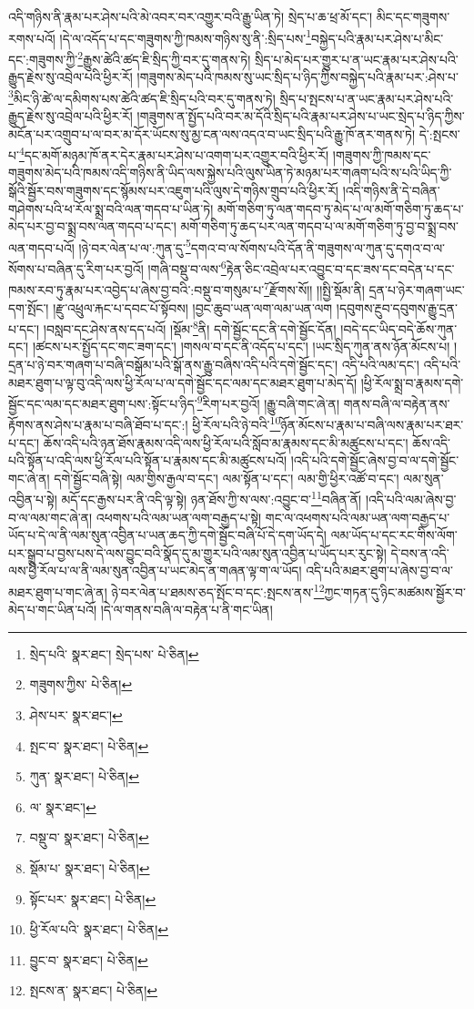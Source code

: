 འདི་གཉིས་ནི་རྣམ་པར་ཤེས་པའི་མེ་འབར་བར་འགྱུར་བའི་རྒྱུ་ཡིན་ཏེ། སྲེད་པ་ཆ་ཕྲ་མོ་དང་། མིང་དང་གཟུགས་རགས་པའོ། །དེ་ལ་འདོད་པ་དང་གཟུགས་ཀྱི་ཁམས་གཉིས་སུ་ནི་:སྲིད་པས་\footnote{སྲེད་པའི་  སྣར་ཐང་། སྲེད་པས་  པེ་ཅིན། }བསྐྱེད་པའི་རྣམ་པར་ཤེས་པ་མིང་དང་:གཟུགས་ཀྱི་\footnote{གཟུགས་ཀྱིས་  པེ་ཅིན། }རྒྱུས་ཚེའི་ཚད་ཇི་སྲིད་ཀྱི་བར་དུ་གནས་ཏེ། སྲིད་པ་མེད་པར་གྱུར་པ་ན་ཡང་རྣམ་པར་ཤེས་པའི་རྒྱུད་རྗེས་སུ་འབྲེལ་པའི་ཕྱིར་རོ། །གཟུགས་མེད་པའི་ཁམས་སུ་ཡང་སྲིད་པ་ཉིད་ཀྱིས་བསྐྱེད་པའི་རྣམ་པར་:ཤེས་པ་\footnote{ཤེས་པར་  སྣར་ཐང་། }མིང་ཉི་ཚེ་ལ་དམིགས་པས་ཚེའི་ཚད་ཇི་སྲིད་པའི་བར་དུ་གནས་ཏེ། སྲིད་པ་སྤངས་པ་ན་ཡང་རྣམ་པར་ཤེས་པའི་རྒྱུད་རྗེས་སུ་འབྲེལ་པའི་ཕྱིར་རོ། །གཟུགས་ན་སྤྱོད་པའི་བར་མ་དོའི་སྲིད་པའི་རྣམ་པར་ཤེས་པ་ཡང་སྲེད་པ་ཉིད་ཀྱིས་མངོན་པར་འགྲུབ་པ་ལ་བར་མ་དོར་ཡོངས་སུ་མྱ་ངན་ལས་འདའ་བ་ཡང་སྲིད་པའི་རྒྱུ་ཁོ་ནར་གནས་ཏེ། དེ་:སྤངས་པ་\footnote{སྤང་བ་  སྣར་ཐང་།  པེ་ཅིན། }དང་མགོ་མཉམ་ཁོ་ནར་དེར་རྣམ་པར་ཤེས་པ་འགག་པར་འགྱུར་བའི་ཕྱིར་རོ། །གཟུགས་ཀྱི་ཁམས་དང་གཟུགས་མེད་པའི་ཁམས་འདི་གཉིས་ནི་ཡིད་ལས་སྐྱེས་པའི་ལུས་ཡིན་ཏེ་མཉམ་པར་གཞག་པའི་ས་པའི་ཡིད་ཀྱི་སྒོའི་སྦྱོར་བས་གཟུགས་དང་སྙོམས་པར་འཇུག་པའི་ལུས་དེ་གཉིས་གྲུབ་པའི་ཕྱིར་རོ། །འདི་གཉིས་ནི་དེ་བཞིན་གཤེགས་པའི་ཕ་རོལ་སྨྲ་བའི་ལན་གདབ་པ་ཡིན་ཏེ། མགོ་གཅིག་ཏུ་ལན་གདབ་ཏུ་མེད་པ་ལ་མགོ་གཅིག་ཏུ་ཆད་པ་མེད་པར་བྱ་བ་སྨྲ་བས་ལན་གདབ་པ་དང་། མགོ་གཅིག་ཏུ་ཆད་པར་ལན་གདབ་པ་ལ་མགོ་གཅིག་ཏུ་བྱ་བ་སྨྲ་བས་ལན་གདབ་པའོ། །ཉེ་བར་ལེན་པ་ལ་:ཀུན་དུ་\footnote{ཀུན་  སྣར་ཐང་།  པེ་ཅིན། }དགའ་བ་ལ་སོགས་པའི་དོན་ནི་གཟུགས་ལ་ཀུན་དུ་དགའ་བ་ལ་སོགས་པ་བཞིན་དུ་རིག་པར་བྱའོ། །གཞི་བསྡུ་བ་ལས་\footnote{ལ་  སྣར་ཐང་། }རྟེན་ཅིང་འབྲེལ་པར་འབྱུང་བ་དང་ཟས་དང་བདེན་པ་དང་ཁམས་རབ་ཏུ་རྣམ་པར་འབྱེད་པ་ཞེས་བྱ་བའི་:བསྡུ་བ་གསུམ་པ་\footnote{བསྡུ་བ་  སྣར་ཐང་།  པེ་ཅིན། }རྫོགས་སོ།། །།སྤྱི་སྡོམ་ནི། དྲན་པ་ཉེར་གཞག་ཡང་དག་སྤོང་། །རྫུ་འཕྲུལ་རྐང་པ་དབང་པོ་སྟོབས། །བྱང་ཆུབ་ཡན་ལག་ལམ་ཡན་ལག །དབུགས་རྔུབ་དབུགས་རྒྱུ་དྲན་པ་དང་། །བསླབ་དང་ཤེས་ནས་དད་པའོ། །སྡོམ་\footnote{སྡོམ་པ་  སྣར་ཐང་།  པེ་ཅིན། }ནི། དགེ་སྦྱོང་དང་ནི་དགེ་སྦྱོང་དོན། །བདེ་དང་ཡིད་བདེ་ཆོས་ཀུན་དང་། །ཚངས་པར་སྤྱོད་དང་གང་ཟག་དང་། །གསལ་བ་དང་ནི་འདོད་པ་དང་། །ཡང་སྲིད་ཀུན་ནས་ཉོན་མོངས་པ། །དྲན་པ་ཉེ་བར་གཞག་པ་བཞི་བསྒོམ་པའི་སྒོ་ནས་རྒྱུ་བཞིས་འདི་པའི་དགེ་སྦྱོང་དང་། འདི་པའི་ལམ་དང་། འདི་པའི་མཐར་ཐུག་པ་ལྟ་བུ་འདི་ལས་ཕྱི་རོལ་པ་ལ་དགེ་སྦྱོང་དང་ལམ་དང་མཐར་ཐུག་པ་མེད་དོ། །ཕྱི་རོལ་སྨྲ་བ་རྣམས་དགེ་སྦྱོང་དང་ལམ་དང་མཐར་ཐུག་པས་:སྟོང་པ་ཉིད་\footnote{སྟོང་པར་  སྣར་ཐང་།  པེ་ཅིན། }རིག་པར་བྱའོ། །རྒྱུ་བཞི་གང་ཞེ་ན། གནས་བཞི་ལ་བརྟེན་ནས་རྟོགས་ནས་ཤེས་པ་རྣམ་པ་བཞི་ཐོབ་པ་དང་:། ཕྱི་རོལ་པའི་ཉེ་བའི་\footnote{ཕྱི་རོལ་པའི་  སྣར་ཐང་།  པེ་ཅིན། }ཉོན་མོངས་པ་རྣམ་པ་བཞི་ལས་རྣམ་པར་ཐར་པ་དང་། ཆོས་འདི་པའི་ཉན་ཐོས་རྣམས་འདི་ལས་ཕྱི་རོལ་པའི་སློབ་མ་རྣམས་དང་མི་མཚུངས་པ་དང་། ཆོས་འདི་པའི་སྟོན་པ་འདི་ལས་ཕྱི་རོལ་པའི་སྟོན་པ་རྣམས་དང་མི་མཚུངས་པའོ། །འདི་པའི་དགེ་སྦྱོང་ཞེས་བྱ་བ་ལ་དགེ་སྦྱོང་གང་ཞེ་ན། དགེ་སྦྱོང་བཞི་སྟེ། ལམ་གྱིས་རྒྱལ་བ་དང་། ལམ་སྟོན་པ་དང་། ལམ་གྱི་ཕྱིར་འཚོ་བ་དང་། ལམ་སུན་འབྱིན་པ་སྟེ། མདོ་དང་རྒྱས་པར་ནི་འདི་ལྟ་སྟེ། ཉན་ཐོས་ཀྱི་ས་ལས་:འབྱུང་བ་\footnote{བྱུང་བ་  སྣར་ཐང་།  པེ་ཅིན། }བཞིན་ནོ། །འདི་པའི་ལམ་ཞེས་བྱ་བ་ལ་ལམ་གང་ཞེ་ན། འཕགས་པའི་ལམ་ཡན་ལག་བརྒྱད་པ་སྟེ། གང་ལ་འཕགས་པའི་ལམ་ཡན་ལག་བརྒྱད་པ་ཡོད་པ་དེ་ལ་ནི་ལམ་སུན་འབྱིན་པ་ཡན་ཆད་ཀྱི་དགེ་སྦྱོང་བཞི་པོ་དེ་དག་ཡོད་དེ། ལམ་ཡོད་པ་དང་རང་གིས་ལོག་པར་སྒྲུབ་པ་བྱས་པས་དེ་ལས་བྱུང་བའི་སྣོད་དུ་མ་གྱུར་པའི་ལམ་སུན་འབྱིན་པ་ཡོད་པར་རུང་སྟེ། དེ་བས་ན་འདི་ལས་ཕྱི་རོལ་པ་ལ་ནི་ལམ་སུན་འབྱིན་པ་ཡང་མེད་ན་གཞན་ལྟ་ག་ལ་ཡོད། འདི་པའི་མཐར་ཐུག་པ་ཞེས་བྱ་བ་ལ་མཐར་ཐུག་པ་གང་ཞེ་ན། ཉེ་བར་ལེན་པ་ཐམས་ཅད་སྤོང་བ་དང་:སྤངས་ནས་\footnote{སྤངས་ན་  སྣར་ཐང་།  པེ་ཅིན། }ཀྱང་གཏན་དུ་ཉིང་མཚམས་སྦྱོར་བ་མེད་པ་གང་ཡིན་པའོ། །དེ་ལ་གནས་བཞི་ལ་བརྟེན་པ་ནི་གང་ཡིན། 